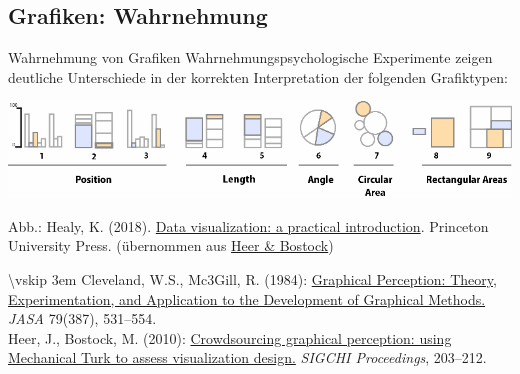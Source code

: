 \documentclass[
  10pt,
  ignorenonframetext,
]{beamer}
\begin{document}
\subsection{Grafiken: Wahrnehmung}\label{grafiken-wahrnehmung}

\begin{frame}{Wahrnehmung von Grafiken}
\label{wahrnehmung-von-grafiken}
Wahrnehmungspsychologische Experimente zeigen deutliche Unterschiede in
der korrekten Interpretation der folgenden Grafiktypen:

\includegraphics{pics/02-clevelandgill1.png}

\scriptsize

Abb.: Healy, K. (2018). \href{https://socviz.co}{Data visualization: a
practical introduction}. Princeton University Press. (übernommen aus
\href{http://vis.stanford.edu/files/2010-MTurk-CHI.pdf}{Heer \&
Bostock})

\textbackslash vskip 3em Cleveland, W.S., Mc3Gill, R. (1984):
\href{http://www.math.pku.edu.cn/teachers/xirb/Courses/biostatistics/Biostatistics2016/GraphicalPerception_Jasa1984.pdf}{Graphical
Perception: Theory, Experimentation, and Application to the Development
of Graphical Methods.} \emph{JASA} 79(387), 531--554.\\
Heer, J., Bostock, M. (2010):
\href{http://vis.stanford.edu/files/2010-MTurk-CHI.pdf}{Crowdsourcing
graphical perception: using Mechanical Turk to assess visualization
design.} \emph{SIGCHI Proceedings}, 203--212.
\end{frame}
\end{document}
